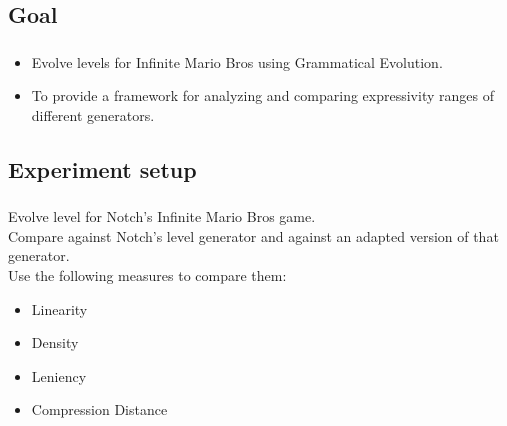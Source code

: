 \documentclass{beamer}
\makeatletter
\newcommand*{\currentname}{\@currentlabelname}
\makeatother
\begin{document}
\subsection{Goal}
\begin{frame}
\frametitle{\currentname}
\begin{itemize}
\item Evolve levels for Infinite Mario Bros using Grammatical Evolution.
\item To provide a framework for analyzing and comparing expressivity ranges of different generators.
\end{itemize}
\end{frame}

\subsection{Experiment setup}
\begin{frame}
\frametitle{\currentname}
Evolve level for Notch's Infinite Mario Bros game.\\
Compare against Notch's level generator and against an adapted version of that generator.\\
Use the following measures to compare them:
\begin{itemize}
\item Linearity
\item Density
\item Leniency
\item Compression Distance
\end{itemize}
\end{frame}
\end{document}
